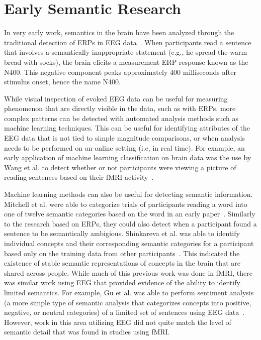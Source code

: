 \label{chapter:relatedwork}

\section{Early Semantic Research}

In very early work, semantics in the brain have been analyzed through the 
traditional detection of ERPs in EEG 
data~\cite{kutas1980reading,kuperberg2007neural}. When participants read a 
sentence that involves a semantically inappropriate statement (e.g., he spread 
the warm bread with socks), the brain elicits a measurement ERP response known 
as the N400. This negative component peaks approximately 400 milliseconds after 
stimulus onset, hence the name N400.

While visual inspection of evoked EEG data can be useful for measuring 
phenomenon that are directly visible in the data, such as with ERPs, more 
complex patterns can be detected with automated analysis methods such as 
machine learning techniques. This can be useful for identifying attributes of 
the EEG data that is not tied to simple magnitude comparisons, or when analysis 
needs to be performed on an online setting (i.e, in real time). For example, an 
early application of machine learning classification on brain data was the use 
by Wang et al. to detect whether or not participants were viewing a picture of 
reading sentences based on their fMRI activity~\cite{Wang2002}. 

Machine learning methods can also be useful for detecting semantic information.  
Mitchell et al. were able to categorize trials of participants reading a word 
into one of twelve semantic categories based on the word in an early 
paper~\cite{Mitchell2002}. Similarly to the research based on ERPs, they could 
also detect when a participant found a sentence to be semantically ambigious. 
Shinkareva et al. was able to identify individual concepts and their 
corresponding semantic categories for a participant based only on the training 
data from other participants~\cite{Shinkareva2008}. This indicated the 
existence of stable semantic representations of concepts in the brain that are 
shared across people. While much of this previous work was done in fMRI, there 
was similar work using EEG that provided evidence of the ability to identify 
limited semantics. For example, Gu et al. was able to perform sentiment 
analysis (a more simple type of semantic analysis that categorizes concepts 
into positive, negative, or neutral categories) of a limited set of sentences 
using EEG data~\cite{Gu2014}. However, work in this area utilizing EEG did not 
quite match the level of semantic detail that was found in studies using fMRI.

